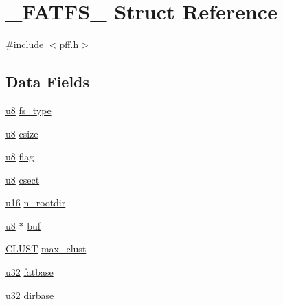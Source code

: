 \hypertarget{struct___f_a_t_f_s__}{\section{\-\_\-\-F\-A\-T\-F\-S\-\_\- Struct Reference}
\label{struct___f_a_t_f_s__}
}


{\ttfamily \#include $<$pff.\-h$>$}

\subsection*{Data Fields}
\begin{DoxyCompactItemize}
\item 
\hyperlink{p8_2pinguino_2core_2typedef_8h_aed742c436da53c1080638ce6ef7d13de}{u8} \hyperlink{struct___f_a_t_f_s___ae868590392e2aed338f5f4a99b2852ec}{fs\-\_\-type}
\item 
\hyperlink{p8_2pinguino_2core_2typedef_8h_aed742c436da53c1080638ce6ef7d13de}{u8} \hyperlink{struct___f_a_t_f_s___a547248beb0ef99f3732da28845ba1982}{csize}
\item 
\hyperlink{p8_2pinguino_2core_2typedef_8h_aed742c436da53c1080638ce6ef7d13de}{u8} \hyperlink{struct___f_a_t_f_s___a547483242c245cdd2fcf26c206833980}{flag}
\item 
\hyperlink{p8_2pinguino_2core_2typedef_8h_aed742c436da53c1080638ce6ef7d13de}{u8} \hyperlink{struct___f_a_t_f_s___aa16ae553396fcffd4ec9c83901d859f1}{csect}
\item 
\hyperlink{p8_2pinguino_2core_2typedef_8h_a50b0d1c7a54fa09a64a3ac111c778520}{u16} \hyperlink{struct___f_a_t_f_s___a804d8b2b6c8a75201db6cea815948b05}{n\-\_\-rootdir}
\item 
\hyperlink{p8_2pinguino_2core_2typedef_8h_aed742c436da53c1080638ce6ef7d13de}{u8} $\ast$ \hyperlink{struct___f_a_t_f_s___ad0d43b186dd10c19ec30b78082185a1d}{buf}
\item 
\hyperlink{tff_8h_af322b62389c843d5727de4796a09f59c}{C\-L\-U\-S\-T} \hyperlink{struct___f_a_t_f_s___aa628566fa0882ed951ed01fc6f20ff1b}{max\-\_\-clust}
\item 
\hyperlink{p8_2pinguino_2core_2typedef_8h_a2caf5cd7bcdbe1eefa727f44ffb10bac}{u32} \hyperlink{struct___f_a_t_f_s___a42441439d769eb2ce0d24154c07776c7}{fatbase}
\item 
\hyperlink{p8_2pinguino_2core_2typedef_8h_a2caf5cd7bcdbe1eefa727f44ffb10bac}{u32} \hyperlink{struct___f_a_t_f_s___a81b8347f85d834041b98540b11e6aae5}{dirbase}
\item 

\end{DoxyCompactItemize}
